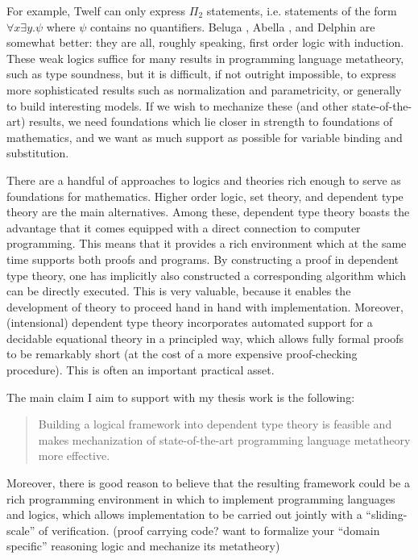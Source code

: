 \documentclass{article}
\newcommand{\LONGVERSION}[1]{{\color{light-gray}#1}}
\begin{document}
For example, Twelf \citep{Pfenning99cade} can only express $\Pi_2$
statements, i.e. statements of the form $\forall x \exists y. \psi$
where $\psi$ contains no quantifiers. Beluga \citep{Pientka:IJCAR10}, Abella \citep{Gacek:IJCAR08}, and
Delphin \citep{Poswolsky:DelphinDesc08} are
somewhat better: they are all, roughly speaking, first order logic
with induction. These weak logics suffice for many results in
programming language metatheory, such as type soundness, but it is
difficult, if not outright impossible, to express more sophisticated
results such as normalization and parametricity, or generally to build
interesting models. If we wish to mechanize these (and other
state-of-the-art) results, we need foundations which lie closer in
strength to foundations of mathematics, and we want as much support as
possible for variable binding and substitution.

There are a handful of approaches to logics and theories rich enough
to serve as foundations for mathematics. Higher order logic, set theory, and dependent
type theory are the main alternatives. Among these, dependent type theory
\citep{Martin-Loef73a} boasts the advantage that it comes equipped with a direct
connection to computer programming. This means that it provides a rich
environment which at the same time supports both proofs and
programs. By constructing a proof in dependent type theory, one has
implicitly also constructed a corresponding algorithm which can be
directly executed. This is very valuable, because it
enables the development of theory to proceed hand in hand
with implementation. Moreover, (intensional) dependent type theory
incorporates automated support for a decidable equational theory in a
principled way, which allows fully formal proofs to be remarkably
short (at the cost of a more expensive proof-checking
procedure). This is often an important practical asset. 

The main claim I aim to support with my thesis work is the following:

\begin{quote}Building a logical framework into dependent type
theory is feasible and makes mechanization of state-of-the-art programming
language metatheory more effective.
\end{quote}

Moreover, there is good reason to believe that the resulting framework
could be a rich programming
environment in which to implement programming languages and logics, which allows
implementation to be carried out jointly with a ``sliding-scale'' of
verification. \LONGVERSION{(proof carrying code? want to formalize your ``domain specific'' reasoning logic and mechanize
its metatheory)}
\end{document}
